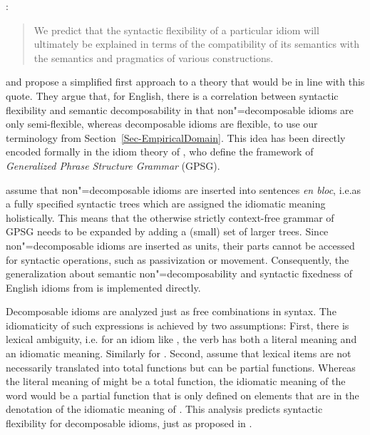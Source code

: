 \documentclass[output=paper]{langsci/langscibook}
\begin{document}
\ea \label{NSW-quote} \citet[]{NSW94a}:
\begin{quotation}
We predict that the syntactic flexibility of a particular idiom will ultimately be explained in terms of the compatibility of its semantics with the semantics and pragmatics of various constructions.
\end{quotation}
\z 



\cite{WSN84a-u} and \cite{NSW94a} propose a simplified first approach to a theory that would be in line with this quote. They argue that, for English, there is a correlation between syntactic flexibility and semantic decomposability in that non"=decomposable idioms are only semi-flexible, whereas decomposable idioms are flexible, to use our terminology from Section~\ref{Sec-EmpiricalDomain}. 
This idea has been directly encoded formally in the idiom theory of
\cite{GKPS85a}, who define the framework of 
\emph{Generalized Phrase Structure Grammar} (GPSG).

\cite{GKPS85a} assume that  non"=decomposable idioms are inserted into sentences \emph{en bloc}, i.e.\@ as a fully specified syntactic trees which are assigned the idiomatic meaning holistically. This means that the otherwise strictly context-free grammar of GPSG needs to be expanded by adding a (small) set of larger trees. 
Since non"=decomposable idioms are inserted as units, their parts cannot be accessed for syntactic operations, such as passivization or movement. Consequently, the generalization about semantic non"=decomposability and syntactic fixedness of English idioms from \cite{WSN84a-u} is implemented directly.

Decomposable idioms are analyzed just as free combinations in syntax. The idiomaticity of such expressions is achieved by two assumptions: First, there is lexical ambiguity, i.e. for an idiom like , the verb  has both a literal meaning and an idiomatic meaning. Similarly for .
Second, \cite{GKPS85a} assume that lexical items are not necessarily translated into total functions but can be partial functions. Whereas the literal meaning of  might be a total function, the idiomatic meaning of the word would be a partial function that is only defined on elements that are in the denotation of the idiomatic meaning of . This analysis predicts syntactic flexibility for decomposable idioms, just as proposed in \cite{WSN84a-u}.
\end{document}
